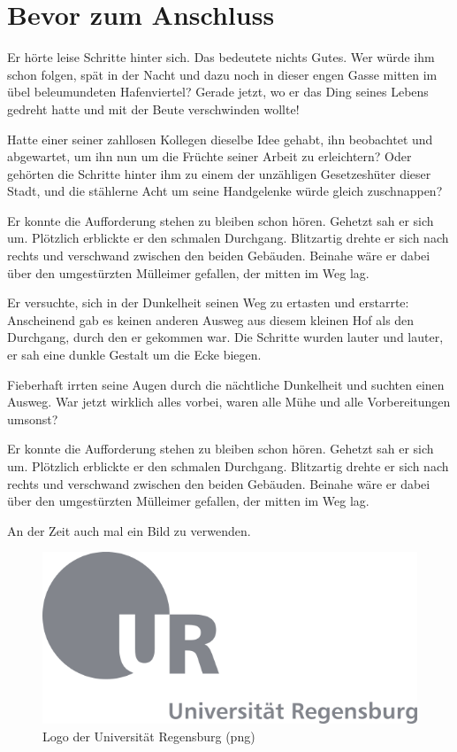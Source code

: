 \documentclass[12pt,ngerman,a4paper,DIV=9,headinclude=true,footinclude=false,titlepage=true,headsepline=true,toc=bibliography,toc=listof]{scrartcl}
\begin{document}
\section{Bevor zum Anschluss}\label{bevor-zum-anschluss}

Er hörte leise Schritte hinter sich. Das bedeutete nichts Gutes. Wer
würde ihm schon folgen, spät in der Nacht und dazu noch in dieser engen
Gasse mitten im übel beleumundeten Hafenviertel? Gerade jetzt, wo er das
Ding seines Lebens gedreht hatte und mit der Beute verschwinden wollte!

Hatte einer seiner zahllosen Kollegen dieselbe Idee gehabt, ihn
beobachtet und abgewartet, um ihn nun um die Früchte seiner Arbeit zu
erleichtern? Oder gehörten die Schritte hinter ihm zu einem der
unzähligen Gesetzeshüter dieser Stadt, und die stählerne Acht um seine
Handgelenke würde gleich zuschnappen?

Er konnte die Aufforderung stehen zu bleiben schon hören. Gehetzt sah er
sich um. Plötzlich erblickte er den schmalen Durchgang. Blitzartig
drehte er sich nach rechts und verschwand zwischen den beiden Gebäuden.
Beinahe wäre er dabei über den umgestürzten Mülleimer gefallen, der
mitten im Weg lag.

Er versuchte, sich in der Dunkelheit seinen Weg zu ertasten und
erstarrte: Anscheinend gab es keinen anderen Ausweg aus diesem kleinen
Hof als den Durchgang, durch den er gekommen war. Die Schritte wurden
lauter und lauter, er sah eine dunkle Gestalt um die Ecke biegen.

Fieberhaft irrten seine Augen durch die nächtliche Dunkelheit und
suchten einen Ausweg. War jetzt wirklich alles vorbei, waren alle Mühe
und alle Vorbereitungen umsonst?

Er konnte die Aufforderung stehen zu bleiben schon hören. Gehetzt sah er
sich um. Plötzlich erblickte er den schmalen Durchgang. Blitzartig
drehte er sich nach rechts und verschwand zwischen den beiden Gebäuden.
Beinahe wäre er dabei über den umgestürzten Mülleimer gefallen, der
mitten im Weg lag.



An der Zeit auch mal ein Bild zu verwenden.

\begin{figure}[htbp]
\centering
\includegraphics{Bilder/ur-logo.png}
\caption{Logo der Universität Regensburg (png)}
\end{figure}
\end{document}
